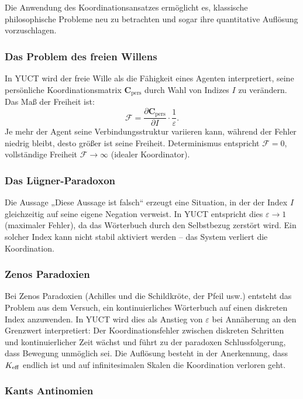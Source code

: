 \documentclass[12pt,a4paper]{article}
\newcommand{\eps}{\varepsilon}
\newcommand{\Cpers}{\mathbf{C}_{\text{pers}}}
\begin{document}
	Die Anwendung des Koordinationsansatzes ermöglicht es, klassische philosophische Probleme neu zu betrachten und sogar ihre quantitative Auflösung vorzuschlagen.
	
	\subsubsection{Das Problem des freien Willens}
	
	In YUCT wird der freie Wille als die Fähigkeit eines Agenten interpretiert, seine persönliche Koordinationsmatrix \(\Cpers\) durch Wahl von Indizes \(I\) zu verändern. Das Maß der Freiheit ist:
	\[
	\mathcal{F} = \frac{\partial \Cpers}{\partial I} \cdot \frac{1}{\eps}.
	\]
	Je mehr der Agent seine Verbindungsstruktur variieren kann, während der Fehler niedrig bleibt, desto größer ist seine Freiheit. Determinismus entspricht \(\mathcal{F} = 0\), vollständige Freiheit \(\mathcal{F} \to \infty\) (idealer Koordinator).
	
	\subsubsection{Das Lügner-Paradoxon}
	
	Die Aussage „Diese Aussage ist falsch“ erzeugt eine Situation, in der der Index \(I\) gleichzeitig auf seine eigene Negation verweist. In YUCT entspricht dies \(\eps \to 1\) (maximaler Fehler), da das Wörterbuch durch den Selbstbezug zerstört wird. Ein solcher Index kann nicht stabil aktiviert werden – das System verliert die Koordination.
	
	\subsubsection{Zenos Paradoxien}
	
	Bei Zenos Paradoxien (Achilles und die Schildkröte, der Pfeil usw.) entsteht das Problem aus dem Versuch, ein kontinuierliches Wörterbuch auf einen diskreten Index anzuwenden. In YUCT wird dies als Anstieg von \(\eps\) bei Annäherung an den Grenzwert interpretiert: Der Koordinationsfehler zwischen diskreten Schritten und kontinuierlicher Zeit wächst und führt zu der paradoxen Schlussfolgerung, dass Bewegung unmöglich sei. Die Auflösung besteht in der Anerkennung, dass \(\Keff\) endlich ist und auf infinitesimalen Skalen die Koordination verloren geht.
	
	\subsubsection{Kants Antinomien}
	
\end{document}
